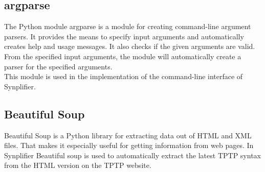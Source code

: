 \subsection{argparse}\label{sec:BackgroundArgparse}

The Python module argparse is a module for creating command-line argument parsers.
It provides the means to specify input arguments and automatically creates help and usage messages.
It also checks if the given arguments are valid.
From the specified input arguments, the module will automatically create a parser for the specified arguments. \cite{argparse}\\
This module is used in the implementation of the command-line interface of \ac{Synplifier}.

\subsection{Beautiful Soup}\label{sec:BackgroundBeautifulSoup}

Beautiful Soup is a Python library for extracting data out of HTML and XML files.
That makes it especially useful for getting information from web pages. \cite{BeautifulSoup,BeautifulSoupDoku}
In \ac{Synplifier} Beautiful soup is used to automatically extract the latest \ac{TPTP} syntax from the HTML version on the \ac{TPTP} website.
